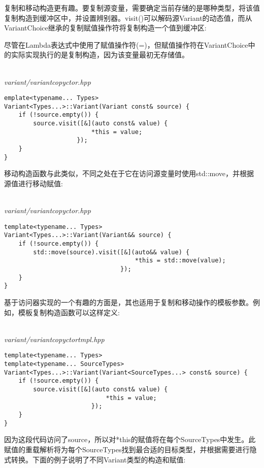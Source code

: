 复制和移动构造更有趣。要复制源变量，需要确定当前存储的是哪种类型，将该值复制构造到缓冲区中，并设置辨别器。visit()可以解码源Variant的动态值，而从VariantChoice继承的复制赋值操作符将复制构造一个值到缓冲区:

\begin{tcolorbox}[colback=webgreen!5!white,colframe=webgreen!75!black]
\hspace*{0.75cm}尽管在Lambda表达式中使用了赋值操作符(=)，但赋值操作符在VariantChoice中的实际实现执行的是复制构造，因为该变量最初无存储值。
\end{tcolorbox}

\hspace*{\fill} \\ %
\noindent
\textit{variant/variantcopyctor.hpp}
\begin{lstlisting}[style=styleCXX]
emplate<typename... Types>
Variant<Types...>::Variant(Variant const& source) {
	if (!source.empty()) {
		source.visit([&](auto const& value) {
						*this = value;
					});
	}
}
\end{lstlisting}

移动构造函数与此类似，不同之处在于它在访问源变量时使用std::move，并根据源值进行移动赋值:

\hspace*{\fill} \\ %
\noindent
\textit{variant/variantcopyctor.hpp}
\begin{lstlisting}[style=styleCXX]
template<typename... Types>
Variant<Types...>::Variant(Variant&& source) {
	if (!source.empty()) {
		std::move(source).visit([&](auto&& value) {
									*this = std::move(value);
								});
	}
}
\end{lstlisting}

基于访问器实现的一个有趣的方面是，其也适用于复制和移动操作的模板参数。例如，模板复制构造函数可以这样定义:

\hspace*{\fill} \\ %
\noindent
\textit{variant/variantcopyctortmpl.hpp}
\begin{lstlisting}[style=styleCXX]
template<typename... Types>
template<typename... SourceTypes>
Variant<Types...>::Variant(Variant<SourceTypes...> const& source) {
	if (!source.empty()) {
		source.visit([&](auto const& value) {
							*this = value;
						});
	}
}
\end{lstlisting}

因为这段代码访问了source，所以对*this的赋值将在每个SourceTypes中发生。此赋值的重载解析将为每个SourceTypes找到最合适的目标类型，并根据需要进行隐式转换。下面的例子说明了不同Variant类型的构造和赋值:


